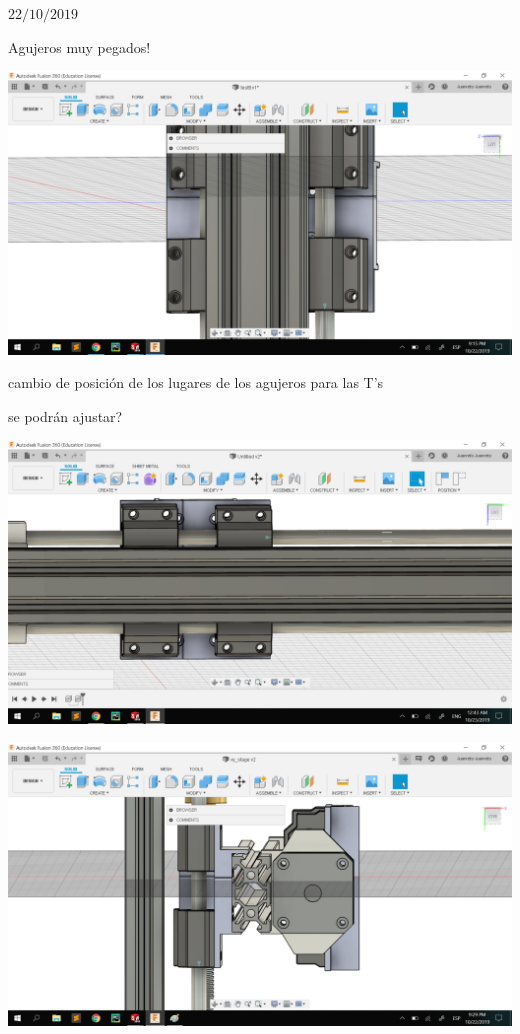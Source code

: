 \documentclass[12pt,dvipsnames]{exam}
\begin{document}
$22/10/2019$

Agujeros muy pegados!

\begin{center}
	\includegraphics[scale=0.5]{imgs/3d_xy/agujeros_problem_2040mount.png}
\end{center}

cambio de posición de los lugares de los agujeros para las T's

se podrán ajustar?

\begin{center}
	\includegraphics[scale=0.5]{imgs/3d_xy/agujeros_beta.png}
\end{center}



\begin{center}
	\includegraphics[scale=0.5]{imgs/3d_xy/fit_arriba.png}
\end{center}
\end{document}
